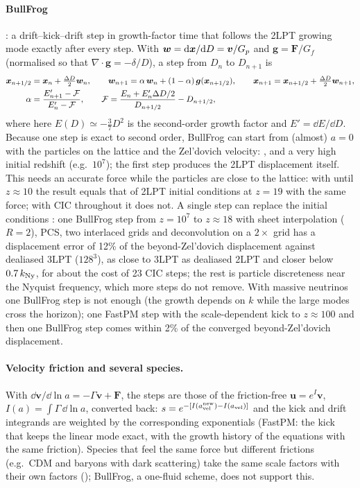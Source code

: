 \paragraph*{BullFrog} \cite{Rampf2025}: a drift--kick--drift step in growth-factor time that follows the 2LPT growing
mode exactly after every step. With $\bm w=\mathrm{d}\bm{x}/\mathrm{d} D=\bm v/G_p$ and $\bm g=\bm F/G_f$ (normalised so that
$\nabla\cdot\bm g=-\delta/D$), a step from $D_n$ to $D_{n+1}$ is
\begin{align}
\bm{x}_{n+1/2}&=\bm{x}_n+\tfrac{\Delta D}{2}\bm w_n,\qquad
\bm w_{n+1}=\alpha\,\bm w_n+(1-\alpha)\,\bm g(\bm{x}_{n+1/2}),\qquad
\bm{x}_{n+1}=\bm{x}_{n+1/2}+\tfrac{\Delta D}{2}\bm w_{n+1},\\
\alpha&=\frac{E'_{n+1}-\mathcal F}{E'_n-\mathcal F},\qquad
\mathcal F=\frac{E_n+E'_n\Delta D/2}{D_{n+1/2}}-D_{n+1/2},
\end{align}
where here $E(D)\simeq-\frac37D^2$ is the second-order growth factor and $E'=\dd E/\dd D$. Because one step is exact
to second order, BullFrog can start from (almost) $a=0$ with the particles on the lattice and the Zel'dovich velocity:
 ,   and a very high initial redshift
(e.g.\ $10^7$); the first step produces the 2LPT displacement itself. This needs an accurate force while the particles
are close to the lattice: with   until $z\approx10$ the result equals that of
2LPT initial conditions at $z=19$ with the same force; with CIC throughout it does not.
A single step can replace the initial conditions \cite{ListBigBang2024}: one BullFrog step from $z=10^7$ to $z\approx18$
with sheet interpolation ($R=2$), PCS, two interlaced grids and deconvolution on a $2\times$ grid has a displacement
error of 12\% of the beyond-Zel'dovich displacement against dealiased 3LPT ($128^3$), as close to 3LPT as dealiased
2LPT and closer below $0.7\,k_{\rm Ny}$, for about the cost of 23 CIC steps; the rest is particle discreteness near the
Nyquist frequency, which more steps do not remove. With massive neutrinos one BullFrog step is not enough (the growth
depends on $k$ while the large modes cross the horizon); one FastPM step with the scale-dependent kick to $z\approx100$
and then one BullFrog step comes within 2\% of the converged beyond-Zel'dovich displacement.

\paragraph*{Velocity friction and several species.} With $\dd\bm v/\dd\ln a=-\Gamma\bm v+\bm F$, the steps are those
of the friction-free $\bm u=e^{I}\bm v$, $I(a)=\int\Gamma\,\dd\ln a$, converted back: $s=e^{-[I(a_{\rm vel}^{\rm new})-
I(a_{\rm vel})]}$ and the kick and drift integrands are weighted by the corresponding exponentials (FastPM: the kick that
keeps the linear mode exact, with the growth history of the equations with the same friction). Species that feel the
same force but different frictions (e.g.\ CDM and baryons with dark scattering) take the same scale factors with
their own factors (); BullFrog, a one-fluid scheme, does not support this.

